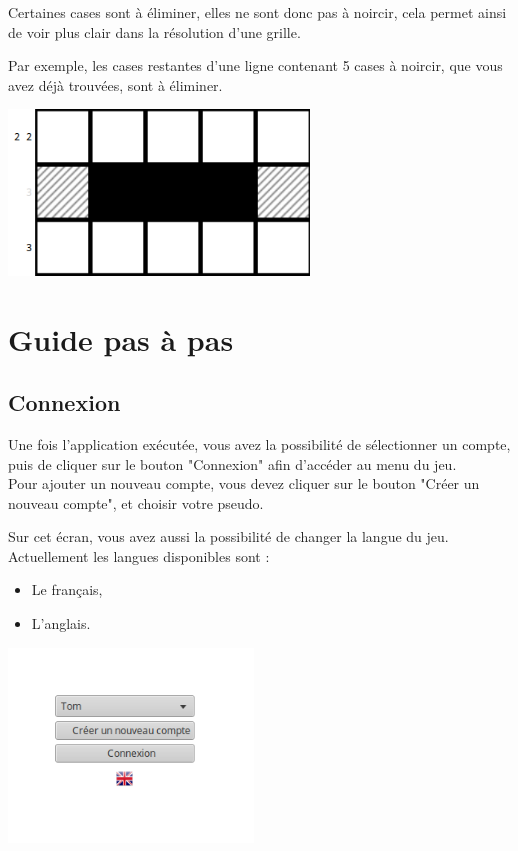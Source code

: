 \documentclass[a4paper, 12pt]{report}
\begin{document}
            Certaines cases sont à éliminer, elles ne sont donc pas à noircir, cela permet ainsi de voir plus clair dans la résolution d'une grille.
            
            Par exemple, les cases restantes d'une ligne contenant 5 cases à noircir, que vous avez déjà trouvées, sont à éliminer.

            \begin{minipage}{\linewidth}
                    \centering
			        \includegraphics[width=8cm]{ligneExemple4.png}
	        \end{minipage}



\chapter{Guide pas à pas}
\thispagestyle{empty}
\thispagestyle{plain}

	\section{Connexion}

        Une fois l'application exécutée, vous avez la possibilité de sélectionner un compte, puis de cliquer sur le bouton "Connexion" afin d'accéder au menu du jeu. \\
        Pour ajouter un nouveau compte, vous devez cliquer sur le bouton "Créer un nouveau compte", et choisir votre pseudo.
        
        Sur cet écran, vous avez aussi la possibilité de changer la langue du jeu. Actuellement les langues disponibles sont :
        \begin{itemize}
            \item Le français,
            \item L'anglais.
        \end{itemize}
        
        \begin{minipage}{\linewidth}
                    \centering
			        \includegraphics[width=6.5cm]{screenMenuCo.png}
	    \end{minipage}
\end{document}
